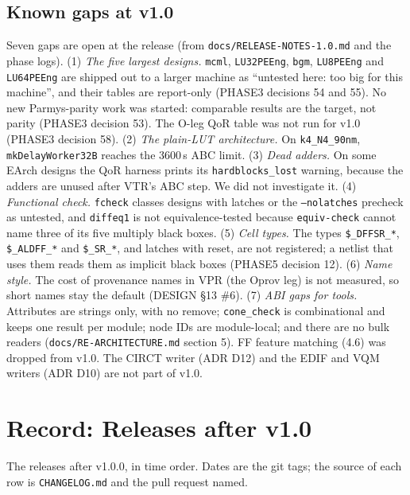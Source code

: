 \documentclass[conference]{IEEEtran}
\newcommand{\code}[1]{\texttt{#1}}
\begin{document}
\subsection{Known gaps at v1.0}

Seven gaps are open at the release (from \code{docs/RELEASE-NOTES-1.0.md} and the phase
logs). (1) \emph{The five largest
designs.} \code{mcml}, \code{LU32PEEng}, \code{bgm}, \code{LU8PEEng} and \code{LU64PEEng} are
shipped out to a larger machine as ``untested here: too big for this machine'', and their tables
are report-only (PHASE3 decisions 54 and 55). No new Parmys-parity work was started: comparable
results are the target, not parity (PHASE3 decision 53). The O-leg QoR table was not run for
v1.0 (PHASE3 decision 58). (2) \emph{The plain-LUT architecture.} On \code{k4\_N4\_90nm},
\code{mkDelayWorker32B} reaches the 3600\,s ABC limit. (3) \emph{Dead adders.} On some EArch
designs the QoR harness prints its \code{hardblocks\_lost} warning, because the adders are unused
after VTR's ABC step. We did not investigate it. (4) \emph{Functional check.} \code{fcheck}
classes designs with latches or the \code{--nolatches} precheck as untested, and \code{diffeq1}
is not equivalence-tested because \code{equiv-check} cannot name three of its five multiply
black boxes. (5) \emph{Cell types.} The types \code{\$\_DFFSR\_*}, \code{\$\_ALDFF\_*} and
\code{\$\_SR\_*}, and latches with reset, are not registered; a netlist that uses them reads
them as implicit black boxes (PHASE5 decision 12). (6) \emph{Name style.} The cost of provenance
names in VPR (the Oprov leg) is not measured, so short names stay the default (DESIGN \S13
\#6). (7) \emph{ABI gaps for tools.} Attributes are strings only, with no remove;
\code{cone\_check} is combinational and keeps one result per module; node IDs are
module-local; and there are no bulk readers (\code{docs/RE-ARCHITECTURE.md} section 5). FF
feature matching (4.6) was dropped from v1.0. The CIRCT writer (ADR D12) and the EDIF and VQM
writers (ADR D10) are not part of v1.0.
\section{Record: Releases after v1.0}
\label{sec:releases}

The releases after v1.0.0, in time order. Dates are the git tags; the source of each row is
\code{CHANGELOG.md} and the pull request named.
\end{document}
